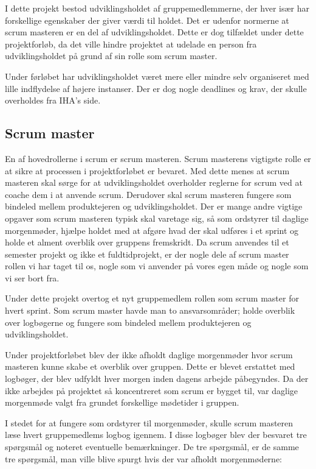 I dette projekt bestod udviklingsholdet af gruppemedlemmerne, der hver især har forskellige egenskaber der giver værdi til holdet. Det er udenfor normerne at scrum masteren er en del af udviklingsholdet. Dette er dog tilfældet under dette projektforløb, da det ville hindre projektet at udelade en person fra udviklingsholdet på grund af sin rolle som scrum master. \par
Under førløbet har udviklingsholdet været mere eller mindre selv organiseret med lille indflydelse af højere instanser. Der er dog nogle deadlines og krav, der skulle overholdes fra IHA's side.


\subsection{Scrum master}
En af hovedrollerne i scrum er scrum masteren. Scrum masterens vigtigste rolle er at sikre at processen i projektforløbet er bevaret. Med dette menes at scrum masteren skal sørge for at udviklingsholdet overholder reglerne for scrum ved at coache dem i at anvende scrum. Derudover skal scrum masteren fungere som bindeled mellem produktejeren og udviklingsholdet. Der er mange andre vigtige opgaver som scrum masteren typisk skal varetage sig, så som ordstyrer til daglige morgenmøder, hjælpe holdet med at afgøre hvad der skal udføres i et sprint og holde et alment overblik over gruppens fremskridt. Da scrum anvendes til et semester projekt og ikke et fuldtidprojekt, er der nogle dele af scrum master rollen vi har taget til os, nogle som vi anvender på vores egen måde og nogle som vi ser bort fra. \newline

Under dette projekt overtog et nyt gruppemedlem rollen som scrum master for hvert sprint. Som scrum master havde man to ansvarsområder; holde overblik over logbøgerne og fungere som bindeled mellem produktejeren og udviklingsholdet. \newline

Under projektforløbet blev der ikke afholdt daglige morgenmøder hvor scrum masteren kunne skabe et overblik over gruppen. Dette er blevet erstattet med logbøger, der blev udfyldt hver morgen inden dagens arbejde påbegyndes. Da der ikke arbejdes på projektet så koncentreret som scrum er bygget til, var daglige morgenmøde valgt fra grundet forskellige mødetider i gruppen. \par
I stedet for at fungere som ordstyrer til morgenmøder, skulle scrum masteren læse hvert gruppemedlems logbog igennem. I disse logbøger blev der besvaret tre spørgsmål og noteret eventuelle bemærkninger. De tre spørgsmål, er de samme tre spørgsmål, man ville blive spurgt hvis der var afholdt morgenmøderne:

